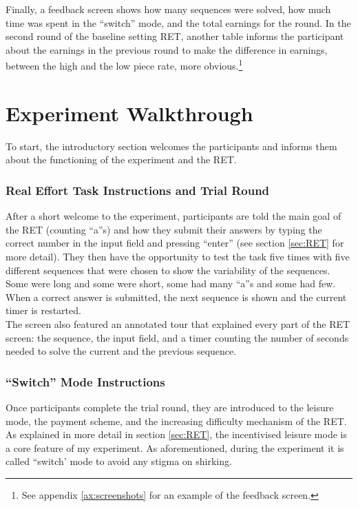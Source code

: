     Finally, a feedback screen shows how many sequences were solved, how much time was spent in the ``switch'' mode, and the total earnings for the round. In the second round of the baseline setting RET, another table informs the participant about the earnings in the previous round to make the difference in earnings, between the high and the low piece rate, more obvious.\footnote{See appendix \ref{ax:screenshots} for an example of the feedback screen.}
    
    \section{Experiment Walkthrough}
    \label{sec:intro_exp}
    
    To start, the introductory section welcomes the participants and informs them about the functioning of the experiment and the RET.
    
    \subsubsection{Real Effort Task Instructions and Trial Round}
    
    After a short welcome to the experiment, participants are told the main goal of the RET (counting ``a''s) and how they submit their answers by typing the correct number in the input field and pressing ``enter'' (see section \ref{sec:RET} for more detail). They then have the opportunity to test the task five times with five different sequences that were chosen to show the variability of the sequences. Some were long and some were short, some had many ``a''s and some had few. When a correct answer is submitted, the next sequence is shown and the current timer is restarted. \\
    
    The screen also featured an annotated tour that explained every part of the RET screen: the sequence, the input field, and a timer counting the number of seconds needed to solve the current and the previous sequence.
    
    \subsubsection{``Switch'' Mode Instructions}
    
    Once participants complete the trial round, they are introduced to the leisure mode, the payment scheme, and the increasing difficulty mechanism of the RET. As explained in more detail in section \ref{sec:RET}, the incentivised leisure mode is a core feature of my experiment. As aforementioned, during the experiment it is called ``switch' mode to avoid any stigma on shirking.\\
    
